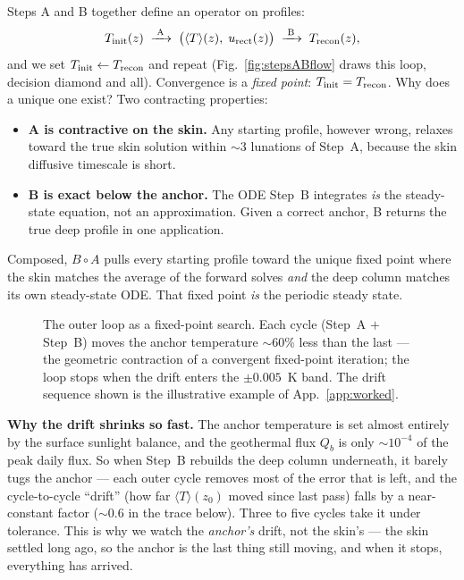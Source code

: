 \documentclass[11pt]{report}
\newcommand{\Tm}{\langle T\rangle}
\begin{document}
Steps A and B together define an operator on profiles:
\[
T_{\rm init}(z)\;\xrightarrow{\;\text{A}\;}\;\bigl(\Tm(z),\;u_{\rm rect}(z)\bigr)
\;\xrightarrow{\;\text{B}\;}\;T_{\rm recon}(z),
\]
and we set $T_{\rm init}\leftarrow T_{\rm recon}$ and repeat
(Fig.~\ref{fig:stepsABflow} draws this loop, decision diamond and all).
Convergence is a
\emph{fixed point}: $T_{\rm init}=T_{\rm recon}$. Why does a unique one exist?
Two contracting properties:
\begin{itemize}[leftmargin=1.4em,itemsep=2pt]
\item \textbf{A is contractive on the skin.} Any starting profile, however wrong,
  relaxes toward the true skin solution within $\sim$3 lunations of Step~A,
  because the skin diffusive timescale is short.
\item \textbf{B is exact below the anchor.} The ODE Step~B integrates \emph{is}
  the steady-state equation, not an approximation. Given a correct anchor, B
  returns the true deep profile in one application.
\end{itemize}
Composed, $B\circ A$ pulls every starting profile toward the unique fixed point
where the skin matches the average of the forward solves \emph{and} the deep
column matches its own steady-state ODE. That fixed point \emph{is} the periodic
steady state.

\begin{figure}[htbp]\centering

\caption{The outer loop as a fixed-point search. Each cycle (Step~A $+$
Step~B) moves the anchor temperature $\sim$60\% less than the last ---
the geometric contraction of a convergent fixed-point iteration; the loop
stops when the drift enters the $\pm 0.005$~K band. The drift sequence shown
is the illustrative example of App.~\ref{app:worked}.}
\label{fig:fixedpoint}
\end{figure}

\begin{plain}
\textbf{Why the drift shrinks so fast.} The anchor temperature is set almost
entirely by the surface sunlight balance, and the geothermal flux $Q_b$ is only
${\sim}10^{-4}$ of the peak daily flux. So when Step~B rebuilds the deep column
underneath, it barely tugs the anchor --- each outer cycle removes most of the
error that is left, and the cycle-to-cycle ``drift'' (how far $\Tm(z_0)$ moved
since last pass) falls by a near-constant factor ($\sim$0.6 in the trace below).
Three to five cycles take it under tolerance. This is why we watch the
\emph{anchor's} drift, not the skin's --- the skin settled long ago, so the
anchor is the last thing still moving, and when it stops, everything has arrived.
\end{plain}
\end{document}
